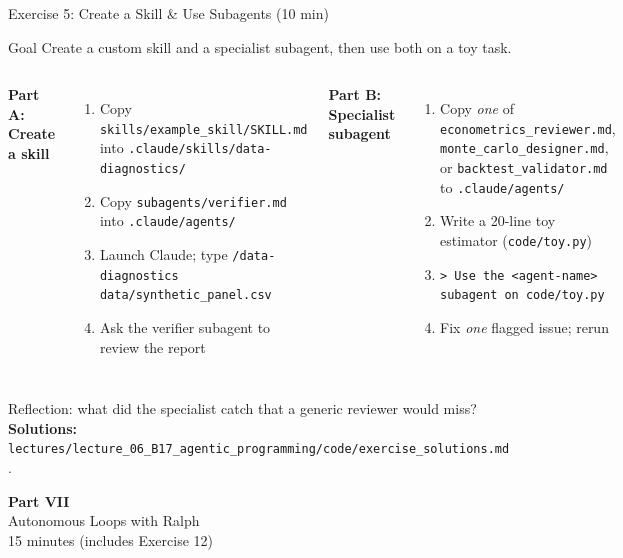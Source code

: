 \documentclass[aspectratio=169,10pt]{beamer}
\newcommand{\emphc}[1]{\textcolor{harvardcrimson}{#1}}
\begin{document}
\begin{frame}[fragile]{Exercise 5: Create a Skill \& Use Subagents {\small(10 min)}}
\scriptsize
\begin{exampleblock}{Goal}
Create a custom skill and a specialist subagent, then use both on a toy task.
\end{exampleblock}

\vspace{0.2em}
\begin{columns}[T]
\textbf{Part A: Create a skill}
\begin{enumerate}\itemsep0pt
    \item Copy \texttt{skills/example\_skill/SKILL.md} into \texttt{.claude/skills/data-diagnostics/}
    \item Copy \texttt{subagents/verifier.md} into \texttt{.claude/agents/}
    \item Launch Claude; type \texttt{/data-diagnostics data/synthetic\_panel.csv}
    \item Ask the verifier subagent to review the report
\end{enumerate}

\textbf{Part B: Specialist subagent}
\begin{enumerate}\itemsep0pt
    \item Copy \emph{one} of \texttt{econometrics\_reviewer.md}, \texttt{monte\_carlo\_designer.md}, or \texttt{backtest\_validator.md} to \texttt{.claude/agents/}
    \item Write a 20-line toy estimator (\texttt{code/toy.py})
    \item \texttt{> Use the <agent-name> subagent on code/toy.py}
    \item Fix \emph{one} flagged issue; rerun
\end{enumerate}
\end{columns}

\vspace{0.2em}
\emphc{Reflection:} what did the specialist catch that a generic reviewer would miss?
\textbf{Solutions:} \texttt{lectures/lecture\_06\_B17\_agentic\_programming/code/exercise\_solutions.md}.
\end{frame}


\begin{frame}{}
\vfill
\begin{center}
{\Huge \textcolor{uzhblue}{\textbf{Part VII}}}\\[12pt]
{\LARGE Autonomous Loops with Ralph}\\[6pt]
{\small 15 minutes (includes Exercise 12)}
\end{center}
\vfill
\end{frame}
\end{document}
